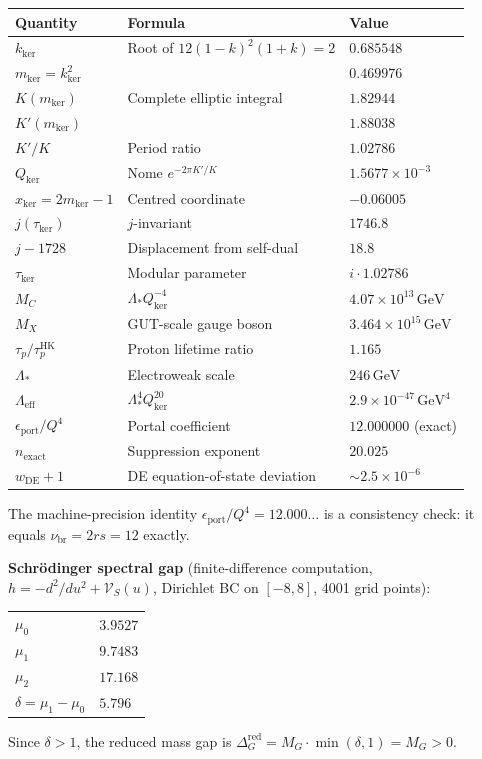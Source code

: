 \documentclass[12pt]{article}
\theoremstyle{plain}
\theoremstyle{definition}
\numberwithin{equation}{section}
\newcommand{\red}{\mathrm{red}}
\newcommand{\br}{\mathrm{br}}
\newcommand{\kker}{\mathrm{ker}}
\begin{document}
\begin{center}
\begin{tabular}{lll}
\toprule
Quantity & Formula & Value\\
\midrule
$k_{\kker}$ & Root of $12(1-k)^2(1+k)=2$ & $0.685548$\\
$m_{\kker}=k_{\kker}^2$ & & $0.469976$\\
$K(m_{\kker})$ & Complete elliptic integral & $1.82944$\\
$K'(m_{\kker})$ & & $1.88038$\\
$K'/K$ & Period ratio & $1.02786$\\
$Q_{\kker}$ & Nome $e^{-2\pi K'/K}$ & $1.5677\times 10^{-3}$\\
$x_{\kker}=2m_{\kker}-1$ & Centred coordinate & $-0.06005$\\
$j(\tau_{\kker})$ & $j$-invariant & $1746.8$\\
$j-1728$ & Displacement from self-dual & $18.8$\\
$\tau_{\kker}$ & Modular parameter & $i\cdot 1.02786$\\
\midrule
$M_C$ & $\Lambda_* Q_{\kker}^{-4}$ & $4.07\times 10^{13}\,\mathrm{GeV}$\\
$M_X$ & GUT-scale gauge boson & $3.464\times 10^{15}\,\mathrm{GeV}$\\
$\tau_p/\tau_p^{\mathrm{HK}}$ & Proton lifetime ratio & $1.165$\\
$\Lambda_*$ & Electroweak scale & $246\,\mathrm{GeV}$\\
$\Lambda_{\mathrm{eff}}$ & $\Lambda_*^4 Q_{\kker}^{20}$ & $2.9\times 10^{-47}\,\mathrm{GeV}^4$\\
$\epsilon_{\mathrm{port}}/Q^4$ & Portal coefficient & $12.000000$ (exact)\\
$n_{\mathrm{exact}}$ & Suppression exponent & $20.025$\\
$w_{\mathrm{DE}}+1$ & DE equation-of-state deviation & $\sim 2.5\times 10^{-6}$\\
\bottomrule
\end{tabular}
\end{center}

The machine-precision identity $\epsilon_{\mathrm{port}}/Q^4=12.000\ldots$ is a consistency check: it equals $\nu_{\br}=2rs=12$ exactly.

\medskip

\noindent\textbf{Schr\"odinger spectral gap} (finite-difference computation, $h=-d^2/du^2+\mathcal{V}_S(u)$, Dirichlet BC on $[-8,8]$, 4001 grid points):
\begin{center}
\begin{tabular}{ll}
$\mu_0$ & $3.9527$\\
$\mu_1$ & $9.7483$\\
$\mu_2$ & $17.168$\\
$\delta=\mu_1-\mu_0$ & $5.796$\\
\end{tabular}
\end{center}
Since $\delta>1$, the reduced mass gap is $\Delta_G^{\red}=M_G\cdot\min(\delta,1)=M_G>0$.
\end{document}
